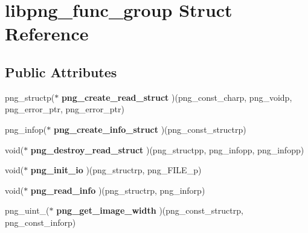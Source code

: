 \hypertarget{structlibpng__func__group}{}\section{libpng\+\_\+func\+\_\+group Struct Reference}
\label{structlibpng__func__group}
\subsection*{Public Attributes}
\begin{DoxyCompactItemize}
\item 
\mbox{\label{structlibpng__func__group_aca79dfc21242a9597aa21d667dbed1b4}} 
png\+\_\+structp($\ast$ {\bfseries png\+\_\+create\+\_\+read\+\_\+struct} )(png\+\_\+const\+\_\+charp, png\+\_\+voidp, png\+\_\+error\+\_\+ptr, png\+\_\+error\+\_\+ptr)
\item 
\mbox{\label{structlibpng__func__group_a622c476002521c58db77241ded709c22}} 
png\+\_\+infop($\ast$ {\bfseries png\+\_\+create\+\_\+info\+\_\+struct} )(png\+\_\+const\+\_\+structrp)
\item 
\mbox{\label{structlibpng__func__group_a05eaaafc270828aceb96c6113deba409}} 
void($\ast$ {\bfseries png\+\_\+destroy\+\_\+read\+\_\+struct} )(png\+\_\+structpp, png\+\_\+infopp, png\+\_\+infopp)
\item 
\mbox{\label{structlibpng__func__group_a39d376d036aa9fd21bcf02607ea4e2d2}} 
void($\ast$ {\bfseries png\+\_\+init\+\_\+io} )(png\+\_\+structrp, png\+\_\+\+F\+I\+L\+E\+\_\+p)
\item 
\mbox{\label{structlibpng__func__group_ad7fe49a1f69ad38d1db7612cf1977c14}} 
void($\ast$ {\bfseries png\+\_\+read\+\_\+info} )(png\+\_\+structrp, png\+\_\+inforp)
\item 
\mbox{\label{structlibpng__func__group_a193027e6403bdebe0aa7fd23116b481a}} 
png\+\_\+uint\+\_($\ast$ {\bfseries png\+\_\+get\+\_\+image\+\_\+width} )(png\+\_\+const\+\_\+structrp, png\+\_\+const\+\_\+inforp)
\item 
\mbox{\label{structlibpng__func__group_a4cb9ebb3347168fd65b619a686865242}} 

\end{DoxyCompactItemize}
